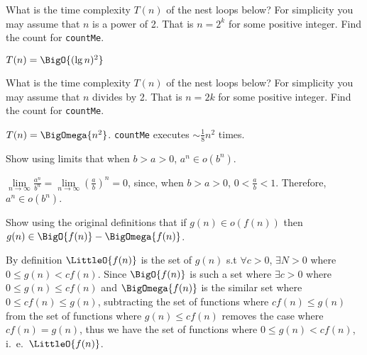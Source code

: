 \documentclass[12pt,letterpaper]{hmcpset}
\begin{document}
\problemlist{}

\begin{problem}[1]
What is the time complexity $T(n)$ of the nest loops below?  For simplicity you may assume that $n$ is a power of 2.  That is $n = 2^k$ for some positive integer.  Find the count for \texttt{countMe}.
\end{problem}

\begin{solution}
$T(n) = \BigO{(\lg n)^2}$
\end{solution}

\begin{problem}[2]
What is the time complexity $T(n)$ of the nest loops below?  For simplicity you may assume that $n$ divides by 2.  That is $n = 2k$ for some positive integer.  Find the count for \texttt{countMe}.
\end{problem}

\begin{solution}
$T(n) = \BigOmega{n^2}$. \texttt{countMe} executes $\sim \frac{1}{8} n^2$ times.
\end{solution}

\begin{problem}[3]
Show using limits that when $b > a > 0$, $a^n \in o(b^n)$.
\end{problem}

\begin{solution}
$\lim\limits_{n \to \infty} \frac{a^n}{b^n} = \lim\limits_{n \to \infty} \left(\frac{a}{b}\right)^n = 0$, since, when $b > a > 0$, $0 < \frac{a}{b} < 1$.  Therefore, $a^n \in o(b^n)$.
\end{solution}

\begin{problem}[4]
Show using the original definitions that if $g(n) \in o(f(n))$ then $g(n) \in \BigO{f(n)} - \BigOmega{f(n)}$.
\end{problem}

\begin{solution}
By definition $\LittleO{f(n)}$ is the set of $g(n)$ s.t $\forall c > 0$, $\exists N>0$ where $0 \leq g(n) < cf(n)$.  Since $\BigO{f(n)}$ is such a set where $\exists c > 0$ where $0 \leq g(n) \leq cf(n)$ and $\BigOmega{f(n)}$ is the similar set where $0 \leq cf(n) \leq g(n)$, subtracting the set of functions where $cf(n) \leq g(n)$ from the set of functions where $g(n) \leq cf(n)$ removes the case where $cf(n) = g(n)$, thus we have the set of functions where $0 \leq g(n) < cf(n)$, i.~e.~$\LittleO{f(n)}$.
\end{solution}
\end{document}
